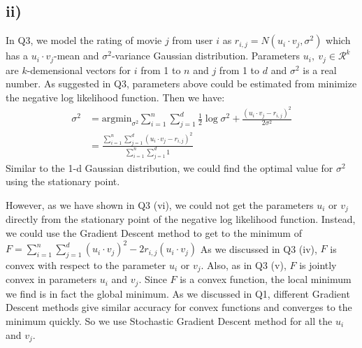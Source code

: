 \documentclass[twoside,11pt]{homework}
\begin{document}
\subsection*{ii)}
In Q3, we model the rating of movie $j$ from user $i$ as $r_{i, j} = N( u_i \cdot v_j, \sigma^2)$ which has a $u_i \cdot v_j$-mean and $\sigma^2$-variance Gaussian distribution.
Parameters $u_i,\ v_j \in \mathcal{R}^k$ are $k$-demensional vectors for $i$ from 1 to $n$ and $j$ from 1 to $d$ and $\sigma^2$ is a real number.
As suggested in Q3, parameters above could be estimated from minimize the negative log likelihood function. 
Then we have:
%
\begin{equation}
\begin{split}
\sigma^2 &= \mathrm{argmin}_{\sigma^2} \sum\limits_{i=1}^n  \sum\limits_{j=1}^d \frac{1}{2}\log \sigma^2 + \frac{(u_i \cdot v_j - r_{i, j})^2}{2\sigma^2} \\
	     &= \frac{\sum\limits_{i=1}^n  \sum\limits_{j=1}^d (u_i \cdot v_j - r_{i, j})^2}{\sum\limits_{i=1}^n  \sum\limits_{j=1}^d 1}
\end{split}
\label{sigma2}
\end{equation}
%
Similar to the 1-d Gaussian distribution, we could find the optimal value for $\sigma^2$ using the stationary point.

However, as we have shown in Q3 (vi), we could not get the parameters $u_i$ or $v_j$ directly from the stationary point of the negative log likelihood function.
Instead, we could use the Gradient Descent method to get to the minimum of  $F = \sum\limits_{i=1}^n \sum\limits_{j=1}^d (u_i \cdot v_j)^2 - 2r_{i, j} (u_i \cdot v_j)$
As we discussed in Q3 (iv), $F$ is convex with respect to the parameter $u_i$ or $v_j$.
Also, as in Q3 (v), $F$ is jointly convex in parameters $u_i$ and $v_j$.
Since $F$ is a convex function, the local minimum we find is in fact the global minimum.
As we discussed in Q1, different Gradient Descent methods give similar accuracy for convex functions and  converges to the minimum quickly.
So we use Stochastic Gradient Descent method for all the $u_i$ and $v_j$.
\end{document}
